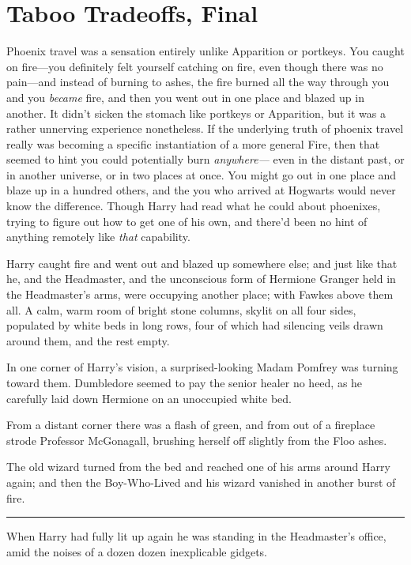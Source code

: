 \chapter{Taboo Tradeoffs, Final}\label{taboo-tradeoffs-final}

Phoenix travel was a sensation entirely unlike Apparition or portkeys.
You caught on fire---you definitely felt yourself catching on fire, even
though there was no pain---and instead of burning to ashes, the fire
burned all the way through you and you \emph{became} fire, and then you
went out in one place and blazed up in another. It didn't sicken the
stomach like portkeys or Apparition, but it was a rather unnerving
experience nonetheless. If the underlying truth of phoenix travel really
was becoming a specific instantiation of a more general Fire, then that
seemed to hint you could potentially burn \emph{anywhere---} even in the
distant past, or in another universe, or in two places at once. You
might go out in one place and blaze up in a hundred others, and the you
who arrived at Hogwarts would never know the difference. Though Harry
had read what he could about phoenixes, trying to figure out how to get
one of his own, and there'd been no hint of anything remotely like
\emph{that} capability.

Harry caught fire and went out and blazed up somewhere else; and just
like that he, and the Headmaster, and the unconscious form of Hermione
Granger held in the Headmaster's arms, were occupying another place;
with Fawkes above them all. A calm, warm room of bright stone columns,
skylit on all four sides, populated by white beds in long rows, four of
which had silencing veils drawn around them, and the rest empty.

In one corner of Harry's vision, a surprised-looking Madam Pomfrey was
turning toward them. Dumbledore seemed to pay the senior healer no heed,
as he carefully laid down Hermione on an unoccupied white bed.

From a distant corner there was a flash of green, and from out of a
fireplace strode Professor McGonagall, brushing herself off slightly
from the Floo ashes.

The old wizard turned from the bed and reached one of his arms around
Harry again; and then the Boy-Who-Lived and his wizard vanished in
another burst of fire.

\begin{center}\rule{3in}{0.4pt}\end{center}

When Harry had fully lit up again he was standing in the Headmaster's
office, amid the noises of a dozen dozen inexplicable gidgets.

